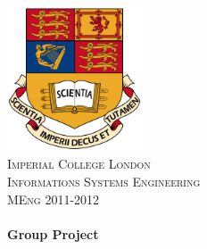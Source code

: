 \begin{titlepage}
\begin{center}

\includegraphics[width=0.30\textwidth]{./logo.png}\\[0.45cm]    

\textsc{\LARGE Imperial College London}\\[1cm]
\textsc{\Large Informations Systems Engineering \\ \vspace{5pt} MEng 2011-2012}\\[0.5cm]


\HRule \\[0.4cm]
{ \huge \bfseries Group Project}\\[0.4cm]

\HRule \\[1.5cm]


\end{center}
\end{titlepage}
